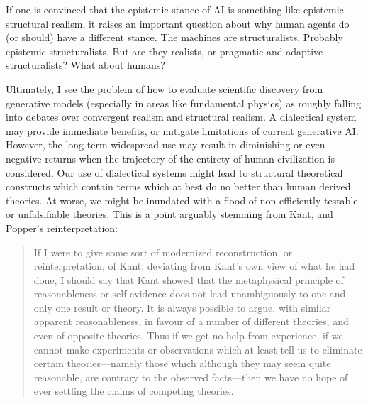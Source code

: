 If one is convinced that the epistemic stance of AI is something like epistemic structural realism, it raises an important question about why human agents do (or should) have a different stance.  The machines are structuralists.  Probably epistemic structuralists.  But are they realists, or pragmatic and adaptive structuralists?  What about humans?


Ultimately, I see the problem of how to evaluate  scientific discovery from generative models (especially in areas like fundamental physics) as roughly falling into debates over convergent realism and structural realism.  A dialectical system may provide immediate benefits, or mitigate limitations of current generative AI.  However, the long term widespread use may result in diminishing or even negative returns when the trajectory of the entirety of human civilization is considered.  Our use of dialectical systems might lead to structural theoretical constructs which contain terms which at best do no better than human derived theories.  At worse, we might be inundated with a flood of non-efficiently testable or unfalsifiable theories.  This is a point arguably stemming from Kant, and Popper's reinterpretation:

\begin{quote}
    If I were to give some sort of modernized reconstruction, or reinterpretation, of Kant, deviating from Kant’s own view of what he had done, I should say that Kant showed that the metaphysical principle of reasonableness or self-evidence does not lead unambiguously to one and only one result or theory. It is always possible to argue, with similar apparent reasonableness, in favour of a number of different theories, and even of opposite theories. Thus if we get no help from experience, if we cannot make experiments or observations which at least tell us to eliminate certain theories—namely those which although they may seem quite reasonable, are contrary to the observed facts—then we have no hope of ever settling the claims of competing theories.
    \citep[p. 439]{PopperCR1963}
\end{quote}




